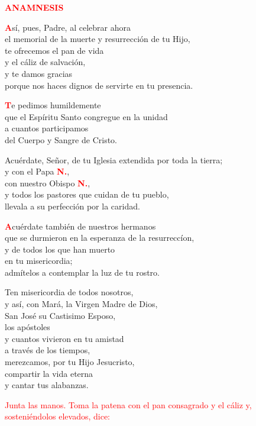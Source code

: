 \documentclass[12pt, letterpaper]{report}
\begin{document}
\Large {\bfseries \textcolor{red}{ANAMNESIS}}

\lettrine[lines=2]{\bfseries \textcolor{red}{A}}{}\Large s\'i, pues, Padre, al celebrar ahora\\ 
el memorial de la muerte y resurrecci\'on de tu Hijo,\\
te ofrecemos el pan de vida\\
y el c\'aliz de salvaci\'on,\\
y te damos gracias\\
porque nos haces dignos de servirte en tu presencia.

\lettrine[lines=2]{\bfseries \textcolor{red}{T}}{}\Large e pedimos humildemente\\
que el Esp\'iritu Santo congregue en la unidad\\
a cuantos participamos\\
del Cuerpo y Sangre de Cristo.

\noindent
Acu\'erdate, Se\~nor, de tu Iglesia extendida por toda la tierra; \\
y con el Papa {\bfseries \textcolor{red}{N.}},\\ 
con nuestro Obispo {\bfseries \textcolor{red}{N.}},\\
y todos los pastores que cuidan de tu pueblo,\\
llevala a su perfecci\'on por la caridad.

\lettrine[lines=2]{\bfseries \textcolor{red}{A}}{}\Large cu\'erdate tambi\'en de nuestros hermanos\\
que se durmieron en la esperanza de la resurrecc\'ion,\\
y de todos los que han muerto\\ 
en tu misericordia;\\
adm\'itelos a contemplar la luz de tu rostro.

\noindent
Ten misericordia de todos nosotros,\\
y as\'i, con Mar\'a, la Virgen Madre de Dios,\\
San Jos\'e su Castisimo Esposo, \\
los ap\'ostoles\\
y cuantos vivieron en tu amistad\\
a trav\'es de los tiempos,\\
merezcamos, por tu Hijo Jesucristo,\\
compartir la vida eterna\\
y cantar tus alabanzas. 

\large{\textcolor{red}{Junta las manos. Toma la patena con el pan consagrado y el c\'aliz y, sosteni\'endolos elevados, dice:}}
\end{document}
